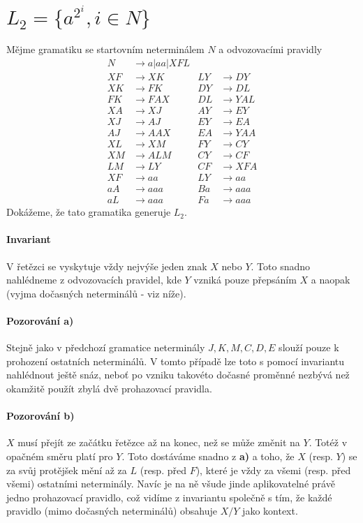 \documentclass{scrartcl}
\begin{document}
    \section{$L_2 = \{a^{2^i}, i \in N\}$}
    Mějme gramatiku se startovním neterminálem $N$ a odvozovacími pravidly
    \begin{align*}
        N &\rightarrow a \vert aa \vert XFL \\
        XF &\rightarrow XK & LY &\rightarrow DY\\
        XK &\rightarrow FK & DY &\rightarrow DL\\
        FK &\rightarrow FAX & DL &\rightarrow YAL\\
        XA &\rightarrow XJ & AY &\rightarrow EY\\
        XJ &\rightarrow AJ & EY &\rightarrow EA\\
        AJ &\rightarrow AAX & EA &\rightarrow YAA\\
        XL &\rightarrow XM & FY &\rightarrow CY\\
        XM &\rightarrow ALM & CY &\rightarrow CF\\
        LM &\rightarrow LY & CF &\rightarrow XFA\\
        XF &\rightarrow aa & LY &\rightarrow aa\\
        aA &\rightarrow aaa & Ba &\rightarrow aaa\\
        aL &\rightarrow aaa & Fa &\rightarrow aaa
    \end{align*}
    Dokážeme, že tato gramatika generuje $L_2$.
    \paragraph{Invariant} V řetězci se vyskytuje vždy nejvýše jeden znak $X$ nebo $Y$. Toto snadno nahlédneme z odvozovacích pravidel, kde $Y$ vzniká pouze přepsáním $X$ a naopak (vyjma dočasných neterminálů - viz níže).

    \paragraph{Pozorování a)} Stejně jako v předchozí gramatice neterminály $J, K, M, C, D, E$ slouží pouze k prohození ostatních neterminálů. V tomto případě lze toto s pomocí invariantu nahlédnout ještě snáz, neboť po vzniku takovéto dočasné proměnné nezbývá než okamžitě použít zbylá dvě prohazovací pravidla.

    \paragraph{Pozorování b)} $X$ musí přejít ze začátku řetězce až na konec, než se může změnit na $Y$. Totéž v opačném směru platí pro $Y$. Toto dostáváme snadno z \textbf{a)} a toho, že $X$ (resp. $Y$) se za svůj protějšek mění až za $L$ (resp. před $F$), které je vždy za všemi (resp. před všemi) ostatními neterminály. Navíc je na ně všude jinde aplikovatelné právě jedno prohazovací pravidlo, což vidíme z invariantu společně s tím, že každé pravidlo (mimo dočasných neterminálů) obsahuje $X/Y$ jako kontext.
\end{document}
